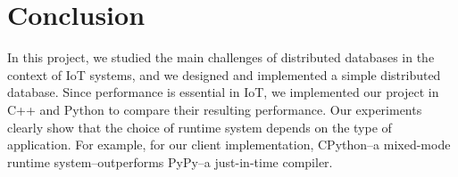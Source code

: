 \section{Conclusion}
\label{sec:Conclusion}
In this project, we studied the main challenges of distributed databases in the context of IoT systems, and we designed and implemented a simple distributed database. Since performance is essential in IoT, we implemented our project in C++ and Python to compare their resulting performance. Our experiments clearly show that the choice of runtime system depends on the type of application. For example, for our client implementation, CPython--a mixed-mode runtime system--outperforms PyPy--a  just-in-time compiler.
